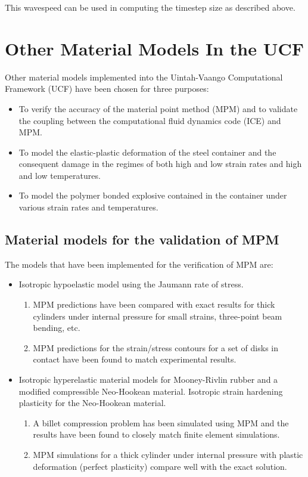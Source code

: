 This wavespeed can be used in computing the timestep size as 
described above.

\section{Other Material Models In the UCF}
Other material models implemented into the Uintah-Vaango Computational
Framework (UCF) have been chosen for three purposes:
\begin{itemize}
  \item To verify the accuracy of the material point method (MPM)
        and to validate the coupling between the computational fluid 
        dynamics code (ICE) and MPM.
  \item To model the elastic-plastic deformation of the steel
        container and the consequent damage in the regimes of 
        both high and low strain rates and high and low temperatures.
  \item To model the polymer bonded explosive contained in the 
        container under various strain rates and temperatures.
\end{itemize}

\subsection{Material models for the validation of MPM}
The models that have been implemented for the verification of MPM
are:
\begin{itemize}
   \item Isotropic hypoelastic model using the Jaumann rate of 
         stress.
     \begin{enumerate}
        \item  MPM predictions have been compared with exact results 
               for thick cylinders under internal pressure for small
               strains, three-point beam bending, etc.
        \item  MPM predictions for the strain/stress contours for
               a set of disks in contact have been found to match
               experimental results.
     \end{enumerate}
   \item Isotropic hyperelastic material models for Mooney-Rivlin
         rubber and a modified compressible Neo-Hookean material. 
         Isotropic strain hardening plasticity for the Neo-Hookean
         material.
     \begin{enumerate}
        \item  A billet compression problem has been simulated using
               MPM and the results have been found to closely 
               match finite element simulations.
        \item  MPM simulations for a thick cylinder under internal
               pressure with plastic deformation (perfect plasticity)
               compare well with the exact solution.
     \end{enumerate}
\end{itemize}


